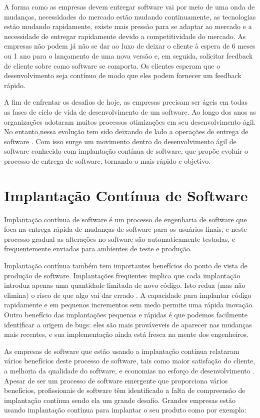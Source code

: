 \documentclass[12pt]{article}
\begin{document}
A forma como as empresas devem entregar software vai por meio de uma onda de mudanças, necessidades do mercado estão mudando continuamente, as tecnologias estão mudando rapidamente, existe mais pressão para se adaptar ao mercado e a necessidade de entregar rapidamente devido a competitividade do mercado. As empresas não podem já não se dar ao luxo de deixar o cliente à espera de 6 meses ou 1 ano para o lançamento de uma nova versão e, em seguida, solicitar feedback de cliente sobre como software se comporta. Os clientes esperam que o desenvolvimento seja contínuo de modo que eles podem fornecer um feedback rápido.

A fim de enfrentar os desafios de hoje, as empresas precisam ser  ágeis em todas as fases de ciclo de vida de desenvolvimento de um software. Ao longo dos anos as organizações adotaram muitos processos otimizações em seu desenvolvimento ágil. No entanto,nessa evolução tem sido deixando de lado a operações de entrega de software \cite{7173368}. Com isso surge um movimento dentro do desenvolvimento ágil de software conhecido com implantação contínua de software, que propõe evoluir o processo de entrega de software, tornando-o mais rápido e objetivo.

\section{Implantação Contínua de Software} \label{sec2}

Implantação contínua de software é um processo de engenharia de software que foca na entrega rápida de mudanças de software para os usuários finais\cite{7284592}, e neste processo gradual as alterações no software são automaticamente testadas, e frequentemente enviadas para ambientes de teste e produção.

Implantação contínua também tem importantes benefícios do ponto de vista de produção de software. Implantações freqüentes implica que cada implantação introduz apenas uma quantidade limitada de novo código. Isto reduz (mas não elimina) o risco de que algo vai dar errado \cite{6449236}. A capacidade para implantar código rapidamente e em pequenos incrementos sem medo permite uma rápida inovação. Outro benefício das implantações pequenas e rápidas  é que podemos facilmente identificar a origem de bugs: eles são mais prováveveis de aparecer nas mudanças mais recentes, e sua implementação ainda está fresca na mente dos engenheiros.

As empresas de software que estão usando a implantação contínua
relataram vários benefícios deste processo de software, tais como
maior satisfação do cliente, a melhoria da qualidade do software,
e economias no esforço de desenvolvimento \cite{7057604}. Apesar de ser um processo de software emergente que proporciona vários benefícios, profissionais de software têm identificado a falta de
compreensão de implantação contínua sendo ela um grande desafio. Grandes empresas estão usando implantação contínua para implantar o seu produto \cite{7284592} como por exemplo:
\end{document}
